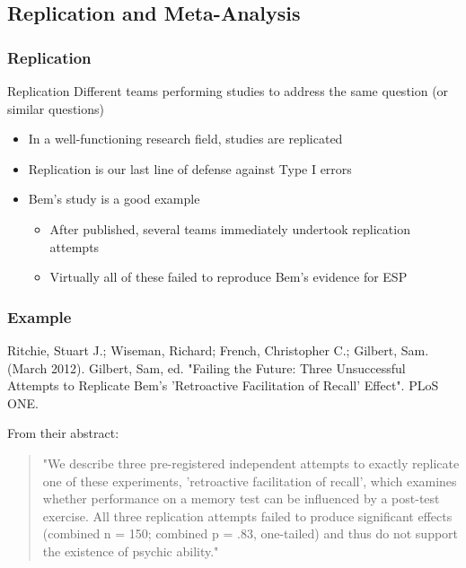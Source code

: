 \documentclass[10pt, block=fill]{beamer}
\begin{document}
\subsection{Replication and Meta-Analysis}

\begin{frame}
    \frametitle{Replication}
    
    \begin{block}{Replication}
        Different teams performing studies to address the same question (or similar questions)
    \end{block}
    
    \begin{itemize}
        \item In a well-functioning research field, studies are replicated
        \item Replication is our last line of defense against Type I errors
        \item Bem's study is a good example
        \begin{itemize}
            \item After published, several teams immediately undertook replication attempts
            \item Virtually all of these failed to reproduce Bem's evidence for ESP
        \end{itemize}
    \end{itemize}
    
\end{frame}

\begin{frame}
    \frametitle{Example}
    
    Ritchie, Stuart J.; Wiseman, Richard; French, Christopher C.; Gilbert, Sam. (March 2012). Gilbert, Sam, ed. "Failing the Future: Three Unsuccessful Attempts to Replicate Bem's 'Retroactive Facilitation of Recall' Effect". PLoS ONE.
    
    \vspace{0.25in}
    
    From their abstract:
    \begin{quote}
        "We describe three pre-registered independent attempts to exactly replicate one of these experiments, 'retroactive facilitation of recall', which examines whether performance on a memory test can be influenced by a post-test exercise. All three replication attempts failed to produce significant effects (combined n = 150; combined p = .83, one-tailed) and thus do not support the existence of psychic ability."
    \end{quote}
    
\end{frame}
\end{document}
